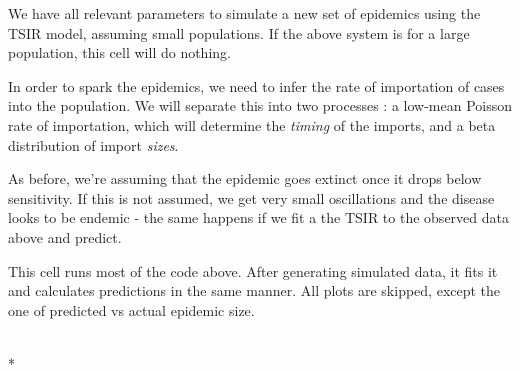 \documentclass[letterpaper,10pt,english]{/Users/qcaudron/anaconda/lib/python2.7/site-packages/Sphinx-1.2b1-py2.7.egg/sphinx/texinputs/sphinxhowto}
\def\smaller{\fontsize{9.5pt}{9.5pt}\selectfont}
\newenvironment{ColorVerbatim}
        {\begin{mdframed}[%
            roundcorner=1.0pt, %
            backgroundcolor=nbframe-bg, %
            userdefinedwidth=1\linewidth, %
            leftmargin=0.1\linewidth, %
            innerleftmargin=0pt, %
            innerrightmargin=0pt, %
            linecolor=nbframe-border, %
            linewidth=1pt, %
            usetwoside=false, %
            everyline=true, %
            innerlinewidth=3pt, %
            innerlinecolor=nbframe-bg, %
            middlelinewidth=1pt, %
            middlelinecolor=nbframe-bg, %
            outerlinewidth=0.5pt, %
            outerlinecolor=nbframe-border, %
            needspace=0pt
        ]}
        {\end{mdframed}}
\renewenvironment{Verbatim}[1][\unskip]
        {\begin{alltt}\smaller}
        {\end{alltt}}
\begin{document}
We have all relevant parameters to simulate a new set of epidemics using
the TSIR model, assuming small populations. If the above system is for a
large population, this cell will do nothing.

In order to spark the epidemics, we need to infer the rate of
importation of cases into the population. We will separate this into two
processes : a low-mean Poisson rate of importation, which will determine
the \emph{timing} of the imports, and a beta distribution of import
\emph{sizes}.

As before, we're assuming that the epidemic goes extinct once it drops
below sensitivity. If this is not assumed, we get very small
oscillations and the disease looks to be endemic - the same happens if
we fit a the TSIR to the observed data above and predict.

This cell runs most of the code above. After generating simulated data,
it fits it and calculates predictions in the same manner. All plots are
skipped, except the one of predicted vs actual epidemic size.


    
        \vspace{6pt}
        \makebox[0.1\linewidth]{\smaller\hfill\tt\color{nbframe-in-prompt}In\hspace{4pt}{[}234{]}:\hspace{4pt}}\\*
        \vspace{-2.65\baselineskip}
        \begin{ColorVerbatim}
            \vspace{-0.7\baselineskip}
            \begin{Verbatim}[commandchars=\\\{\}]

\end{Verbatim}

            
                \vspace{0.3\baselineskip}
            
        \end{ColorVerbatim}
    


\end{document}
